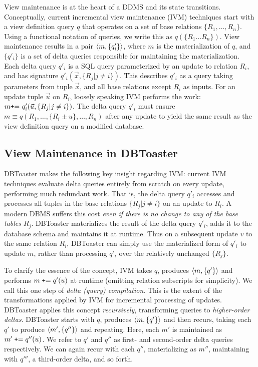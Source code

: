 \label{sec:compilation}

View maintenance is at the heart of a DDMS and its state transitions.
Conceptually, current incremental view maintenance (IVM) techniques
\cite{roussopoulos-tods:91,griffin-sigmod:95,zhou-icde:07,zhou-vldb:07} start
with a view definition query $q$ that operates on a set of base
relations $\{R_1, \ldots, R_n\}$. Using a functional notation of queries, we
write this as $q(\{R_1 \ldots R_n\})$. View maintenance results in a pair
${\langle m,\{q'_i\}\rangle}$, where $m$ is the materialization of $q$, and $\{q'_i\}$ is
a set of delta queries responsible for maintaining the materialization. Each
delta query $q'_i$ is a SQL query parameterized by an update to relation $R_i$,
and has signature $q'_i(\vec{x}, \{R_j | j \neq i\})$. This describes $q'_i$
as a query taking parameters from tuple $\vec{x}$, and all base relations
except $R_i$ as inputs. For an update tuple $\vec{u}$ on $R_i$, loosely speaking
IVM performs the work: $m \mbox{{\tt+}= } q'_i(\vec{u}, \{R_j | j \neq i\})$.
The delta query $q'_i$ must ensure
$m \equiv q(R_1, \ldots, \{R_i \pm {u}\}, \ldots, R_n)$ after any update to
yield the same result as the view definition query on a modified database.


\subsection{View Maintenance in DBToaster}
DBToaster makes the following key insight regarding IVM: current IVM techniques
evaluate delta queries entirely from scratch on every update, performing much
redundant work. That is, the delta query $q'_i$ accesses and processes all
tuples in the base relations $\{R_j | j \neq i\}$ on an update to $R_i$.
A modern DBMS suffers this cost \textit{even if there is no change to any of the
base tables $R_j$}.
DBToaster materializes the result of the delta query $q'_i$, adds it to the
database schema and maintains it at runtime. Thus on a subsequent update $v$ to
the same relation $R_i$, DBToaster can simply use the materialized form of
$q'_i$ to update $m$, rather than processing $q'_i$ over the
relatively unchanged $\{R_j\}$.

To clarify the essence of the concept, IVM takes $q$, produces
${\langle m,\{q'\}\rangle}$ and performs $m \; \mbox{{\tt +}=} \; q'(u)$ at runtime
(omitting relation subscripts for simplicity). We call this one step of
\textit{delta (query) compilation}. This is the extent of the transformations
applied by IVM for incremental processing of updates. DBToaster applies this
concept \textit{recursively}, transforming queries to \textit{higher-order
deltas}. DBToaster starts with $q$, produces ${\langle m,\{q'\}\rangle}$ and then recurs,
taking each $q'$ to produce ${\langle m', \{q''\}\rangle}$ and repeating. Here, each $m'$
is maintained as $m' \; \mbox{{\tt +}=} \; q''(u)$. We refer to $q'$ and $q''$
as first- and second-order delta queries respectively. We can again recur with
each $q''$, materializing as $m''$, maintaining with $q'''$, a third-order
delta, and so forth.

